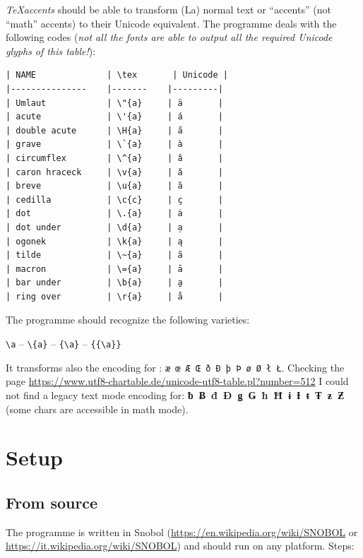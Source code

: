 \documentclass[
  12pt,
  english,
]{article}
\begin{document}
\emph{TeXaccents} should be able to transform (La) normal text or
``accents'' (not ``math'' accents) to their Unicode equivalent. The
programme deals with the following codes (\emph{not all the fonts are
able to output all the required Unicode glyphs of this table!}):

\begin{verbatim}
| NAME              | \tex       | Unicode |
|---------------    |-------    |---------|
| Umlaut            | \"{a}     | ä       |
| acute             | \'{a}     | á       |
| double acute      | \H{a}     | a̋       |
| grave             | \`{a}     | à       |
| circumflex        | \^{a}     | â       |
| caron hraceck     | \v{a}     | ǎ       |
| breve             | \u{a}     | ă       |
| cedilla           | \c{c}     | ç       |
| dot               | \.{a}     | ȧ       |
| dot under         | \d{a}     | ạ       |
| ogonek            | \k{a}     | ą       |
| tilde             | \~{a}     | ã       |
| macron            | \={a}     | ā       |
| bar under         | \b{a}     | a̱       |
| ring over         | \r{a}     | å       |
\end{verbatim}

The programme should recognize the following varieties:

\texttt{\textbackslash{}\textquotesingle{}a} --
\texttt{\textbackslash{}\textquotesingle{}\{a\}} --
\texttt{\{\textbackslash{}\textquotesingle{}a\}} --
\texttt{\{\{\textbackslash{}\textquotesingle{}a\}\}}

It transforms also the encoding for : \texttt{æ~œ~Æ~Œ~ð~Ð~þ~Þ~ø~Ø~ł~Ł}.
Checking the page
\url{https://www.utf8-chartable.de/unicode-utf8-table.pl?number=512} I
could not find a legacy text mode encoding for:
\textbf{ƀ~Ƀ~đ~Đ~ǥ~Ǥ~ħ~Ħ~ɨ~Ɨ~ŧ~Ŧ~ƶ~Ƶ} (some chars are accessible in math
mode).

\hypertarget{setup}{%
\section{Setup}\label{setup}}

\hypertarget{from-source}{%
\subsection{From source}\label{from-source}}

The programme is written in Snobol
(\url{https://en.wikipedia.org/wiki/SNOBOL} or
\url{https://it.wikipedia.org/wiki/SNOBOL}) and should run on any
platform. Steps:
\end{document}
